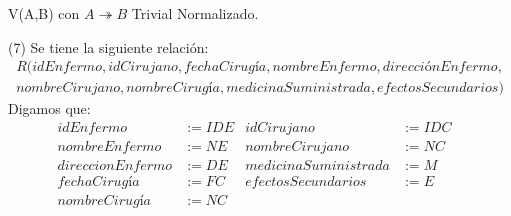 \documentclass{article}
\begin{document}
    V(A,B) con $A \twoheadrightarrow B$ Trivial Normalizado.
    \item[(7)] Se tiene la siguiente relación:
    \begin{multline*}
      R(idEnfermo,idCirujano,fechaCirugía,nombreEnfermo,direcciónEnfermo, \\
      nombreCirujano,nombreCirugía,medicinaSuministrada,efectosSecundarios)
    \end{multline*}
    Digamos que:
    \begin{align*}
      idEnfermo &:= IDE & idCirujano &:= IDC \\
      nombreEnfermo &:= NE & nombreCirujano &:= NC  \\
      direccionEnfermo &:= DE & medicinaSuministrada &:= M & \\
      fechaCirugía &:= FC & efectosSecundarios &:= E \\
      nombreCirugía &:= NC
    \end{align*}
\end{document}
